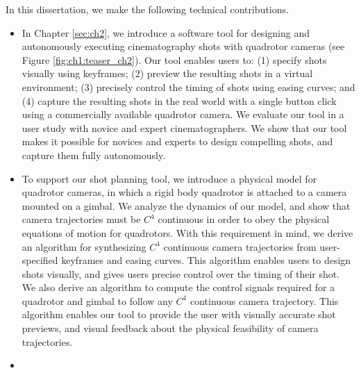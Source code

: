 In this dissertation, we make the following technical contributions.

\begin{itemize}

\item

In Chapter \ref{sec:ch2}, we introduce a software tool for designing and autonomously executing cinematography shots with quadrotor cameras (see Figure \ref{fig:ch1:teaser_ch2}).
Our tool enables users to: (1) specify shots visually using keyframes; (2) preview the resulting shots in a virtual environment; (3) precisely control the timing of shots using easing curves; and (4) capture the resulting shots in the real world with a single button click using a commercially available quadrotor camera.
We evaluate our tool in a user study with novice and expert cinematographers.
We show that our tool makes it possible for novices and experts to design compelling shots, and capture them fully autonomously.

\item 

To support our shot planning tool, we introduce a physical model for quadrotor cameras, in which a rigid body quadrotor is attached to a camera mounted on a gimbal.
We analyze the dynamics of our model, and show that camera trajectories must be $C^4$ continuous in order to obey the physical equations of motion for quadrotors.
With this requirement in mind, we derive an algorithm for synthesizing $C^4$ continuous camera trajectories from user-specified keyframes and easing curves.
This algorithm enables users to design shots visually, and gives users precise control over the timing of their shot.
We also derive an algorithm to compute the control signals required for a quadrotor and gimbal to follow any $C^4$ continuous camera trajectory.
This algorithm enables our tool to provide the user with visually accurate shot previews, and visual feedback about the physical feasibility of camera trajectories.

\item


\end{itemize}
